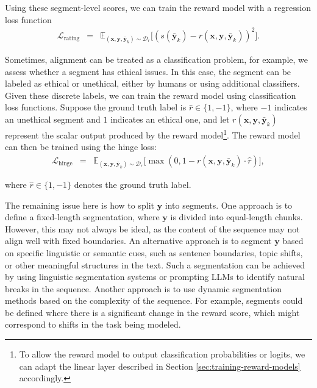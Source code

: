 Using these segment-level scores, we can train the reward model with a regression loss function
\begin{eqnarray}
\mathcal{L}_{\mathrm{rating}} & = & \mathbb{E}_{(\mathbf{x},\mathbf{y},\bar{\mathbf{y}}_k) \sim \mathcal{D}_r} \big[ (s(\bar{\mathbf{y}}_k) - r(\mathbf{x}, \mathbf{y}, \bar{\mathbf{y}}_k))^2 \big].
\end{eqnarray}

Sometimes, alignment can be treated as a classification problem, for example, we assess whether a segment has ethical issues. In this case, the segment can be labeled as ethical or unethical, either by humans or using additional classifiers. Given these discrete labels, we can train the reward model using classification loss functions. Suppose the ground truth label is $\hat{r} \in \{1,-1\}$, where $-1$ indicates an unethical segment and $1$ indicates an ethical one, and let $r(\mathbf{x}, \mathbf{y}, \bar{\mathbf{y}}_k)$ represent the scalar output produced by the reward model\footnote{To allow the reward model to output classification probabilities or logits, we can adapt the linear layer described in Section \ref{sec:training-reward-models} accordingly.}. The reward model can then be trained using the hinge loss:
\begin{eqnarray}
\mathcal{L}_{\mathrm{hinge}} & = & \mathbb{E}_{(\mathbf{x},\mathbf{y},\bar{\mathbf{y}}_k) \sim \mathcal{D}_r} \big[  \max(0, 1 - r(\mathbf{x}, \mathbf{y}, \bar{\mathbf{y}}_k) \cdot \hat{r}) \big],
\end{eqnarray}

\noindent where $\hat{r} \in \{1,-1\}$ denotes the ground truth label.

The remaining issue here is how to split $\mathbf{y}$ into segments. One approach is to define a fixed-length segmentation, where $\mathbf{y}$ is divided into equal-length chunks. However, this may not always be ideal, as the content of the sequence may not align well with fixed boundaries. An alternative approach is to segment $\mathbf{y}$ based on specific linguistic or semantic cues, such as sentence boundaries, topic shifts, or other meaningful structures in the text. Such a segmentation can be achieved by using linguistic segmentation systems or prompting LLMs to identify natural breaks in the sequence. Another approach is to use dynamic segmentation methods based on the complexity of the sequence. For example, segments could be defined where there is a significant change in the reward score, which might correspond to shifts in the task being modeled.

